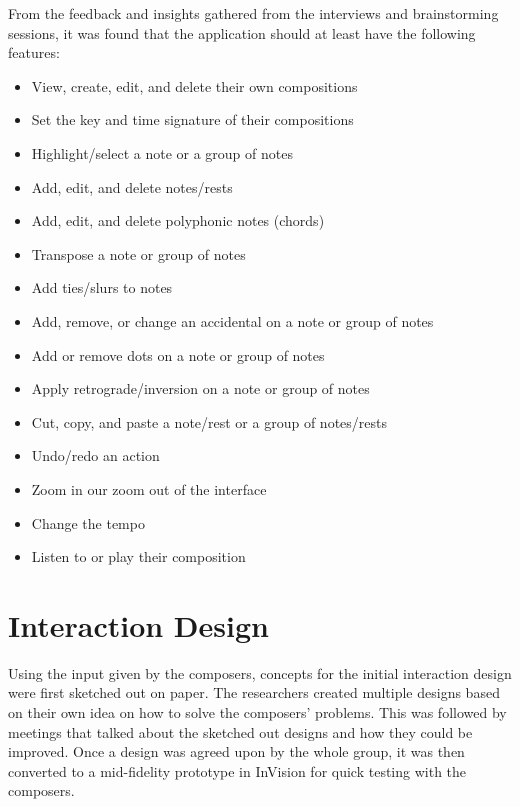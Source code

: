			From the feedback and insights gathered from the interviews and brainstorming sessions, it was found that the application should at least have the following features: 
			\begin{itemize}
    			\item View, create, edit, and delete their own compositions
    			\item Set the key and time signature of their compositions
    			\item Highlight/select a note or a group of notes
             	\item Add, edit, and delete notes/rests 
              	\item Add, edit, and delete polyphonic notes (chords)
           		\item Transpose a note or group of notes
        		\item Add ties/slurs to notes
              	\item Add, remove, or change an accidental on a note or group of notes
              	\item Add or remove dots on a note or group of notes
              	\item Apply retrograde/inversion on a note or group of notes
              	\item Cut, copy, and paste a note/rest or a group of notes/rests
              	\item Undo/redo an action
              	\item Zoom in our zoom out of the interface
              	\item Change the tempo
              	\item Listen to or play their composition
          	\end{itemize}				

	\section{Interaction Design}

		Using the input given by the composers, concepts for the initial interaction design were first sketched out on paper. The researchers created multiple designs based on their own idea on how to solve the composers' problems. This was followed by meetings that talked about the sketched out designs and how they could be improved. Once a design was agreed upon by the whole group, it was then converted to a mid-fidelity prototype in InVision for quick testing with the composers. 

